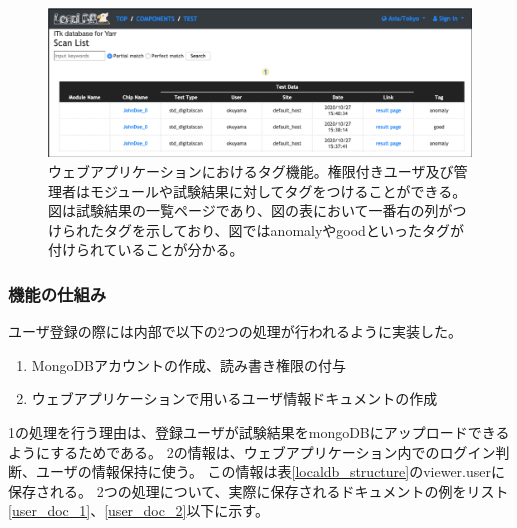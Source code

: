 \begin{figure}[bpt]\centering
\includegraphics[width=12cm]{viewer_tag}
\caption[ウェブアプリケーションにおけるタグ機能]{ウェブアプリケーションにおけるタグ機能。権限付きユーザ及び管理者はモジュールや試験結果に対してタグをつけることができる。図は試験結果の一覧ページであり、図の表において一番右の列がつけられたタグを示しており、図ではanomalyやgoodといったタグが付けられていることが分かる。}
\label{webapp_tag}
\end{figure}

\clearpage

\subsubsection{機能の仕組み}
ユーザ登録の際には内部で以下の2つの処理が行われるように実装した。

\begin{enumerate}
  \item MongoDBアカウントの作成、読み書き権限の付与
  \item ウェブアプリケーションで用いるユーザ情報ドキュメントの作成
\end{enumerate}

1の処理を行う理由は、登録ユーザが試験結果をmongoDBにアップロードできるようにするためである。
2の情報は、ウェブアプリケーション内でのログイン判断、ユーザの情報保持に使う。
この情報は表\ref{localdb_structure}のviewer.userに保存される。
2つの処理について、実際に保存されるドキュメントの例をリスト\ref{user_doc_1}、\ref{user_doc_2}以下に示す。

